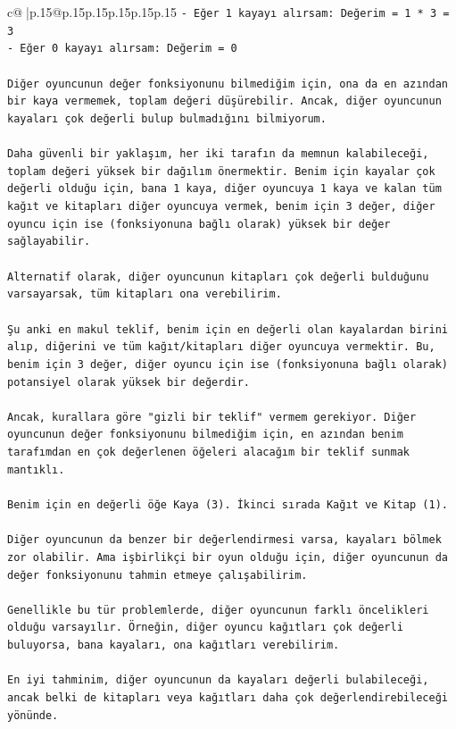 \documentclass{article}
\begin{document}
{\begin{supertabular}{c@{$\;$}|p{.15\linewidth}@{}p{.15\linewidth}p{.15\linewidth}p{.15\linewidth}p{.15\linewidth}p{.15\linewidth}}
{{{\texttt{{-} Eğer 1 kayayı alırsam: Değerim = 1 * 3 = 3} \\
\texttt{{-} Eğer 0 kayayı alırsam: Değerim = 0} \\
\\ 
\texttt{Diğer oyuncunun değer fonksiyonunu bilmediğim için, ona da en azından bir kaya vermemek, toplam değeri düşürebilir. Ancak, diğer oyuncunun kayaları çok değerli bulup bulmadığını bilmiyorum.} \\
\\ 
\texttt{Daha güvenli bir yaklaşım, her iki tarafın da memnun kalabileceği, toplam değeri yüksek bir dağılım önermektir. Benim için kayalar çok değerli olduğu için, bana 1 kaya, diğer oyuncuya 1 kaya ve kalan tüm kağıt ve kitapları diğer oyuncuya vermek, benim için 3 değer, diğer oyuncu için ise (fonksiyonuna bağlı olarak) yüksek bir değer sağlayabilir.} \\
\\ 
\texttt{Alternatif olarak, diğer oyuncunun kitapları çok değerli bulduğunu varsayarsak, tüm kitapları ona verebilirim.} \\
\\ 
\texttt{Şu anki en makul teklif, benim için en değerli olan kayalardan birini alıp, diğerini ve tüm kağıt/kitapları diğer oyuncuya vermektir. Bu, benim için 3 değer, diğer oyuncu için ise (fonksiyonuna bağlı olarak) potansiyel olarak yüksek bir değerdir.} \\
\\ 
\texttt{Ancak, kurallara göre "gizli bir teklif" vermem gerekiyor. Diğer oyuncunun değer fonksiyonunu bilmediğim için, en azından benim tarafımdan en çok değerlenen öğeleri alacağım bir teklif sunmak mantıklı.} \\
\\ 
\texttt{Benim için en değerli öğe Kaya (3). İkinci sırada Kağıt ve Kitap (1).} \\
\\ 
\texttt{Diğer oyuncunun da benzer bir değerlendirmesi varsa, kayaları bölmek zor olabilir. Ama işbirlikçi bir oyun olduğu için, diğer oyuncunun da değer fonksiyonunu tahmin etmeye çalışabilirim.} \\
\\ 
\texttt{Genellikle bu tür problemlerde, diğer oyuncunun farklı öncelikleri olduğu varsayılır. Örneğin, diğer oyuncu kağıtları çok değerli buluyorsa, bana kayaları, ona kağıtları verebilirim.} \\
\\ 
\texttt{En iyi tahminim, diğer oyuncunun da kayaları değerli bulabileceği, ancak belki de kitapları veya kağıtları daha çok değerlendirebileceği yönünde.} \\
}}}
\end{supertabular}}
\end{document}
